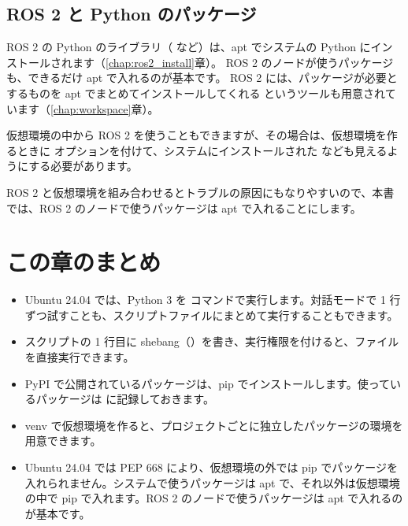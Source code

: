 \subsection{ROS 2 と Python のパッケージ}

ROS 2 の Python のライブラリ（ など）は、apt でシステムの Python にインストールされます（\ref{chap:ros2_install}章）。
ROS 2 のノードが使うパッケージも、できるだけ apt で入れるのが基本です。
ROS 2 には、パッケージが必要とするものを apt でまとめてインストールしてくれる  というツールも用意されています（\ref{chap:workspace}章）。

仮想環境の中から ROS 2 を使うこともできますが、その場合は、仮想環境を作るときに  オプションを付けて、システムにインストールされた  なども見えるようにする必要があります。


ROS 2 と仮想環境を組み合わせるとトラブルの原因にもなりやすいので、本書では、ROS 2 のノードで使うパッケージは apt で入れることにします。

\section*{この章のまとめ}

\begin{itemize}
  \item Ubuntu 24.04 では、Python 3 を  コマンドで実行します。対話モードで 1 行ずつ試すことも、スクリプトファイルにまとめて実行することもできます。
  \item スクリプトの 1 行目に shebang（）を書き、実行権限を付けると、ファイルを直接実行できます。
  \item PyPI で公開されているパッケージは、pip でインストールします。使っているパッケージは  に記録しておきます。
  \item venv で仮想環境を作ると、プロジェクトごとに独立したパッケージの環境を用意できます。
  \item Ubuntu 24.04 では PEP 668 により、仮想環境の外では pip でパッケージを入れられません。システムで使うパッケージは apt で、それ以外は仮想環境の中で pip で入れます。ROS 2 のノードで使うパッケージは apt で入れるのが基本です。
\end{itemize}
